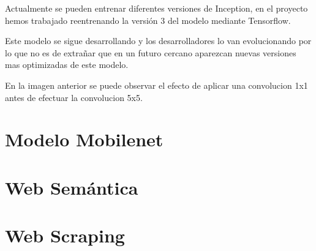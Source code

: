Actualmente se pueden entrenar diferentes versiones de Inception, en el proyecto hemos trabajado reentrenando la versión 3 del modelo mediante Tensorflow.

Este modelo se sigue desarrollando y los desarrolladores lo van evolucionando por lo que no es de extrañar que en un futuro cercano aparezcan nuevas versiones mas optimizadas de este modelo.


En la imagen anterior se puede observar el efecto de aplicar una convolucion 1x1 antes de efectuar la convolucion 5x5.

\section{Modelo Mobilenet}

\section{Web Semántica}

\section{Web Scraping}
















